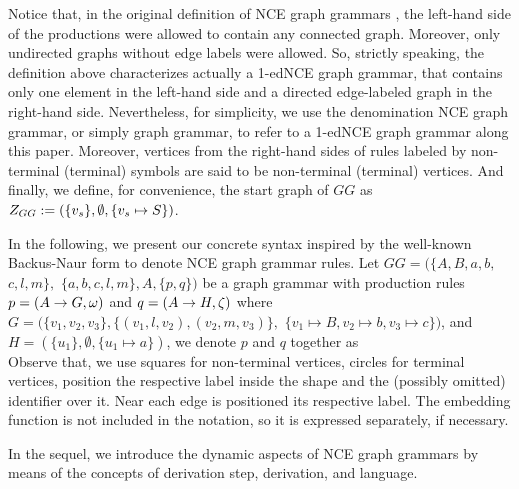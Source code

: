 \documentclass[runningheads]{llncs}
\begin{document}
Notice that, in the original definition of NCE graph grammars \cite{janssens1982graph}, the left-hand side of the productions were allowed to contain any connected graph. Moreover, only undirected graphs without edge labels were allowed. So, strictly speaking, the definition above characterizes actually a 1-edNCE graph grammar, that contains only one element in the left-hand side and a directed edge-labeled graph in the right-hand side. Nevertheless, for simplicity, we use the denomination NCE graph grammar, or simply graph grammar, to refer to a 1-edNCE graph grammar along this paper. Moreover, vertices from the right-hand sides of rules labeled by non-terminal (terminal) symbols are said to be non-terminal (terminal) vertices. And finally, we define, for convenience, the start graph of $GG$ as $Z_{GG} := (\{v_s\},\emptyset,\{v_s \mapsto S\})$. 


In the following, we present our concrete syntax inspired by the well-known Backus-Naur form to denote NCE graph grammar rules. Let $GG = (\{A, B, a, b,$ $ c, l, m\},$ $\{a, b, c, l, m\}, A, \{p,q\})$ be a graph grammar with production rules $p = (A \to G,\omega)$ and $q = (A \to H,\zeta)$ where $G = (\{v_1, v_2, v_3\}, \{(v_1,l,v_2), (v_2,m,v_3)\},$ $\{v_1 \mapsto B, v_2 \mapsto b, v_3 \mapsto c \})$, and $H = (\{u_1\}, \emptyset, \{u_1 \mapsto a\})$, we denote $p$ and $q$ together as\\


Observe that, we use squares for non-terminal vertices, circles for terminal vertices, position the respective label inside the shape and the (possibly omitted) identifier over it. Near each edge is positioned its respective label. The embedding function is not included in the notation, so it is expressed separately, if necessary.

In the sequel, we introduce the dynamic aspects of NCE graph grammars by means of the concepts of derivation step, derivation, and language.
\end{document}
